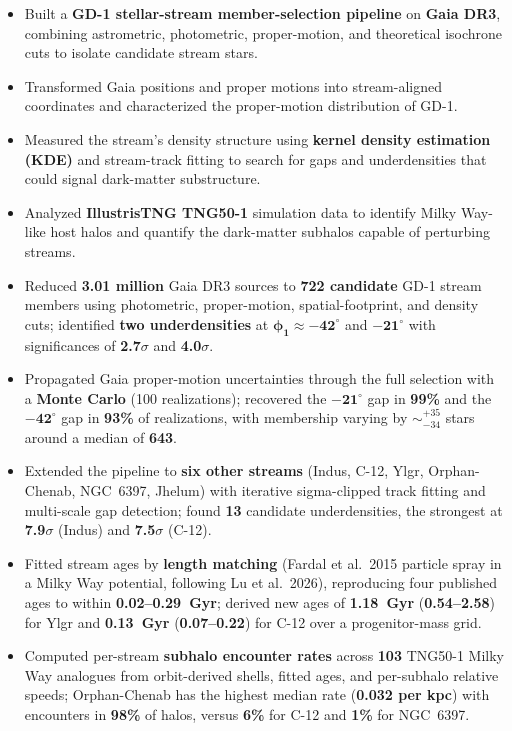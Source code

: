 \documentclass[11pt,a4paper]{article}
\begin{document}
\begin{itemize}
\item Built a \textbf{GD-1 stellar-stream member-selection pipeline} on \textbf{Gaia DR3}, combining astrometric, photometric, proper-motion, and theoretical isochrone cuts to isolate candidate stream stars.
\item Transformed Gaia positions and proper motions into stream-aligned coordinates and characterized the proper-motion distribution of GD-1.
\item Measured the stream's density structure using \textbf{kernel density estimation (KDE)} and stream-track fitting to search for gaps and underdensities that could signal dark-matter substructure.
\item Analyzed \textbf{IllustrisTNG TNG50-1} simulation data to identify Milky Way-like host halos and quantify the dark-matter subhalos capable of perturbing streams.
\item Reduced \textbf{3.01 million} Gaia DR3 sources to \textbf{722 candidate} GD-1 stream members using photometric, proper-motion, spatial-footprint, and density cuts; identified \textbf{two underdensities} at \textbf{$\boldsymbol{\phi_1\approx-42^\circ}$} and \textbf{$\boldsymbol{-21^\circ}$} with significances of \textbf{2.7$\sigma$} and \textbf{4.0$\sigma$}.
\item Propagated Gaia proper-motion uncertainties through the full selection with a \textbf{Monte Carlo} (100 realizations); recovered the \textbf{$\boldsymbol{-21^\circ}$} gap in \textbf{99\%} and the \textbf{$\boldsymbol{-42^\circ}$} gap in \textbf{93\%} of realizations, with membership varying by $\sim$$^{+35}_{-34}$ stars around a median of \textbf{643}.
\item Extended the pipeline to \textbf{six other streams} (Indus, C-12, Ylgr, Orphan-Chenab, NGC~6397, Jhelum) with iterative sigma-clipped track fitting and multi-scale gap detection; found \textbf{13} candidate underdensities, the strongest at \textbf{7.9$\sigma$} (Indus) and \textbf{7.5$\sigma$} (C-12).
\item Fitted stream ages by \textbf{length matching} (Fardal et al.\ 2015 particle spray in a Milky Way potential, following Lu et al.\ 2026), reproducing four published ages to within \textbf{0.02--0.29~Gyr}; derived new ages of \textbf{1.18~Gyr} (\textbf{0.54--2.58}) for Ylgr and \textbf{0.13~Gyr} (\textbf{0.07--0.22}) for C-12 over a progenitor-mass grid.
\item Computed per-stream \textbf{subhalo encounter rates} across \textbf{103} TNG50-1 Milky Way analogues from orbit-derived shells, fitted ages, and per-subhalo relative speeds; Orphan-Chenab has the highest median rate (\textbf{0.032 per kpc}) with encounters in \textbf{98\%} of halos, versus \textbf{6\%} for C-12 and \textbf{1\%} for NGC~6397.
\end{itemize}
 
\end{document}
